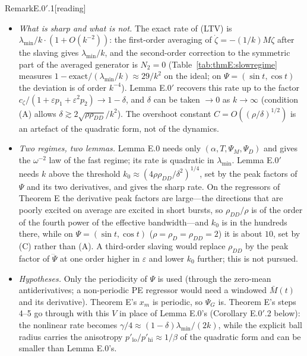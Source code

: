 \begin{rmk}{Remark}{E.0$'$.1}[reading]\mbox{}
\begin{itemize}
  \item \emph{What is sharp and what is not.} The exact rate of (LTV) is $\lambda_{\min}/k\cdot(1+O(k^{-2}))$: the
    first-order averaging of $\dot\zeta=-(1/k)M\zeta$ after the slaving gives $\lambda_{\min}/k$, and the second-order
    correction to the symmetric part of the averaged generator is $N_2=0$ (Table~\ref{tab:thmE:slowregime} measures
    $1-\text{exact}/(\lambda_{\min}/k)\approx29/k^2$ on the ideal; on $\Psi=(\sin t,\cos t)$ the deviation is of
    order $k^{-4}$). Lemma E.0$'$ recovers this rate up to the factor
    $c_\zeta/(1+\varepsilon p_1+\varepsilon^2p_2)\to1-\delta$, and $\delta$ can be taken $\to0$ as $k\to\infty$
    (condition (A) allows $\delta\gtrsim2\sqrt{\rho\rho_{DD}}/k^2$). The overshoot constant $C=O((\rho/\delta)^{1/2})$
    is an artefact of the quadratic form, not of the dynamics.
  \item \emph{Two regimes, two lemmas.} Lemma E.0 needs only $(\alpha,T,\Psi_M,\Psi_D)$ and gives the $\omega^{-2}$ law
    of the fast regime; its rate is quadratic in $\lambda_{\min}$. Lemma E.0$'$ needs $k$ above the threshold
    $k_0\approx(4\rho\rho_{DD}/\delta^2)^{1/4}$, set by the peak factors of $\Psi$ and its two derivatives, and gives
    the sharp rate. On the regressors of Theorem E the derivative peak factors are large---the directions that are
    poorly excited on average are excited in short bursts, so $\rho_{DD}/\rho$ is of the order of the fourth power of
    the effective bandwidth---and $k_0$ is in the hundreds there, while on $\Psi=(\sin t,\cos t)$
    ($\rho=\rho_D=\rho_{DD}=2$) it is about $10$, set by (C) rather than (A). A third-order slaving would replace
    $\rho_{DD}$ by the peak factor of $\dddot\Psi$ at one order higher in $\varepsilon$ and lower $k_0$ further; this is
    not pursued.
  \item \emph{Hypotheses.} Only the periodicity of $\Psi$ is used (through the zero-mean antiderivatives; a
    non-periodic PE regressor would need a windowed $\bar M(t)$ and its derivative). Theorem E's $x_m$ is periodic, so
    $\Psi_G$ is. Theorem E's steps 4--5 go through with this $V$ in place of Lemma E.0's (Corollary E.0$'$.2 below):
    the nonlinear rate becomes $\gamma/4\approx(1-\delta)\lambda_{\min}/(2k)$, while the explicit ball radius carries
    the anisotropy $p'_{\mathrm{lo}}/p'_{\mathrm{hi}}\approx1/\beta$ of the quadratic form and can be smaller than
    Lemma E.0's.
\end{itemize}
\end{rmk}

